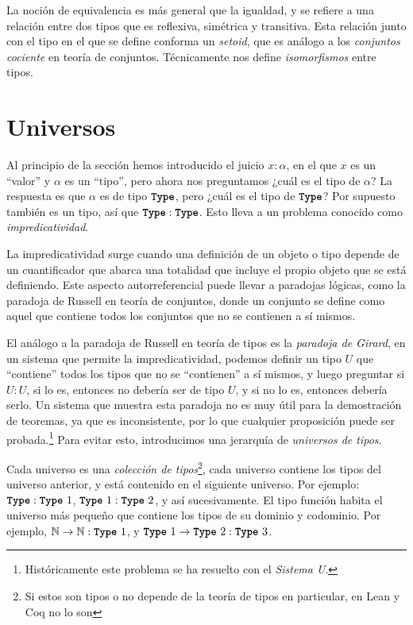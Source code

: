 \documentclass[
  a4paper, 
  10pt, 
  parskip=half, 
  toc=bibliography,
]{scrbook}
\theoremstyle{definition}
\theoremstyle{bolddef}
\newcommand{\tyfont}[1]{\texttt{\textbf{#1}}}
\begin{document}
La noción de equivalencia es más general que la igualdad, y se refiere a una relación
entre dos tipos que es reflexiva, simétrica y transitiva. Esta relación junto
con el tipo en el que se define conforma un \emph{setoid}, que es análogo 
a los \emph{conjuntos cociente} en teoría de conjuntos. Técnicamente nos define
\emph{isomorfismos} entre tipos.

\section{Universos}

Al principio de la sección hemos introducido el juicio \(x: \alpha\), en el que
\(x\) es un \enquote{valor} y \(\alpha\) es un \enquote{tipo}, pero ahora nos preguntamos
¿cuál es el tipo de \(\alpha\)? La respuesta es que \(\alpha\) es de tipo
\(\tyfont{Type}\), pero ¿cuál es el tipo de \(\tyfont{Type}\)? Por supuesto también es
un tipo, así que \(\tyfont{Type}: \tyfont{Type}\). 
Esto lleva a un problema conocido como \emph{impredicatividad}.

La impredicatividad surge cuando una definición de un objeto o tipo depende de un
cuantificador que abarca una totalidad que incluye el propio objeto que se está
definiendo. Este aspecto autorreferencial puede llevar a paradojas lógicas,
como la paradoja de Russell en teoría de conjuntos, donde un conjunto se define
como aquel que contiene todos los conjuntos que no se contienen a sí mismos.

El análogo a la paradoja de Russell en teoría de tipos es la \emph{paradoja de
Girard}, en un sistema que permite la impredicatividad, podemos definir un tipo \(U\)
que \enquote{contiene} todos los tipos que no se \enquote{contienen} a sí mismos, y luego preguntar si
\(U: U\), si lo es, entonces no debería ser de tipo \(U\), y si no lo es, entonces
debería serlo. Un sistema que muestra esta paradoja no es muy útil para la
demostración de teoremas, ya que es inconsistente, por lo que cualquier
proposición puede ser probada.\footnote{
  Históricamente este problema se ha resuelto con el \emph{Sistema U}.} Para evitar
esto, introducimos una jerarquía de \emph{universos de tipos}.

Cada universo es una \emph{colección de tipos}\footnote{Si estos son tipos o no depende de la
  teoría de tipos en particular, en Lean y Coq no lo son}, cada universo contiene los
tipos del universo anterior, y está contenido en el siguiente universo. Por
ejemplo: \(\tyfont{Type}: \tyfont{Type} \ 1\),
\(\tyfont{Type} \ 1: \tyfont{Type} \ 2\), y así sucesivamente. El tipo función
habita el universo más pequeño que contiene los tipos de su dominio y codominio.
Por ejemplo, \(\mathbb{N} \to \mathbb{N}: \tyfont{Type} \ 1\), y
\(\tyfont{Type} \ 1 \to \tyfont{Type} \ 2: \tyfont{Type} \ 3\).
\end{document}
